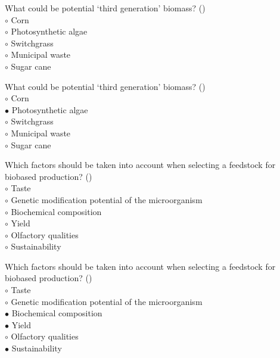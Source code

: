 \documentclass[]{beamer}
\begin{document}
\begin{CJK}{UTF8}{gbsn}
\begin{frame}[shrink] {}
\addtocounter{questions}{1}
\color{blue}
What could be potential ‘third generation’ biomass?
({})\\
\color{black}
\setlength{\parindent}{-0.4cm}
{\color{red}$\circ$} Corn  \\
{\color{red}$\circ$}  Photosynthetic algae  \\
{\color{red}$\circ$} Switchgrass  \\
{\color{red}$\circ$} Municipal waste  \\
{\color{red}$\circ$} Sugar cane  \\
\end{frame}
\begin{frame}[shrink] {}
\addtocounter{answers}{1}
\color{blue}
What could be potential ‘third generation’ biomass?
({})\\
\color{black}
\setlength{\parindent}{-0.4cm}
{\color{red}$\circ$} Corn  \\
{\color{red}$\bullet$} Photosynthetic algae  \\
{\color{red}$\circ$} Switchgrass  \\
{\color{red}$\circ$} Municipal waste  \\
{\color{red}$\circ$} Sugar cane  \\
\end{frame}


\begin{frame}[shrink] {}
\addtocounter{questions}{1}
\color{blue}
Which factors should be taken into account when selecting a feedstock for biobased production?
({})\\
\color{black}
\setlength{\parindent}{-0.4cm}
{\color{red}$\circ$} Taste  \\
{\color{red}$\circ$} Genetic modification potential of the microorganism  \\
{\color{red}$\circ$}  Biochemical composition  \\
{\color{red}$\circ$}  Yield  \\
{\color{red}$\circ$} Olfactory qualities  \\
{\color{red}$\circ$}  Sustainability  \\
\end{frame}
\begin{frame}[shrink] {}
\addtocounter{answers}{1}
\color{blue}
Which factors should be taken into account when selecting a feedstock for biobased production?
({})\\
\color{black}
\setlength{\parindent}{-0.4cm}
{\color{red}$\circ$} Taste  \\
{\color{red}$\circ$} Genetic modification potential of the microorganism  \\
{\color{red}$\bullet$} Biochemical composition  \\
{\color{red}$\bullet$} Yield  \\
{\color{red}$\circ$} Olfactory qualities  \\
{\color{red}$\bullet$} Sustainability  \\
\end{frame}



\end{CJK}
\end{document}
